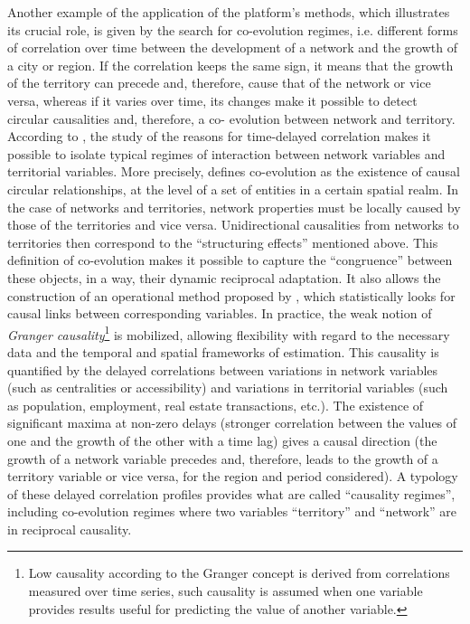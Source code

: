 \documentclass[10pt]{article}
\begin{document}
Another example of the application of the platform’s methods, which illustrates its crucial role, is given by the search for co-evolution regimes, i.e. different forms of correlation over time between the development of a network and the growth of a city or region. If the correlation keeps the same sign, it means that the growth of the territory can precede and, therefore, cause that of the network or vice versa, whereas if it varies over time, its changes make it possible to detect circular causalities and, therefore, a co- evolution between network and territory. According to \cite{raimbault2017identification}, the study of the reasons for time-delayed correlation makes it possible to isolate typical regimes of interaction between network variables and territorial variables. More precisely, \cite{raimbault2018modelisation} defines co-evolution as the existence of causal circular relationships, at the level of a set of entities in a certain spatial realm. In the case of networks and territories, network properties must be locally caused by those of the territories and vice versa. Unidirectional causalities from networks to territories then correspond to the ``structuring effects'' mentioned above. This definition of co-evolution makes it possible to capture the ``congruence'' \citep{offner1993effets} between these objects, in a way, their dynamic reciprocal adaptation. It also allows the construction of an operational method proposed by \cite{raimbault2017identification}, which statistically looks for causal links between corresponding variables. In practice, the weak notion of \emph{Granger causality}\footnote{Low causality according to the Granger concept is derived from correlations measured over time series, such causality is assumed when one variable provides results useful for predicting the value of another variable.} is mobilized, allowing flexibility with regard to the necessary data and the temporal and spatial frameworks of estimation. This causality is quantified by the delayed correlations between variations in network variables (such as centralities or accessibility) and variations in territorial variables (such as population, employment, real estate transactions, etc.). The existence of significant maxima at non-zero delays (stronger correlation between the values of one and the growth of the other with a time lag) gives a causal direction (the growth of a network variable precedes and, therefore, leads to the growth of a territory variable or vice versa, for the region and period considered). A typology of these delayed correlation profiles provides what are called ``causality regimes'', including co-evolution regimes where two variables ``territory'' and ``network'' are in reciprocal causality.
\end{document}
